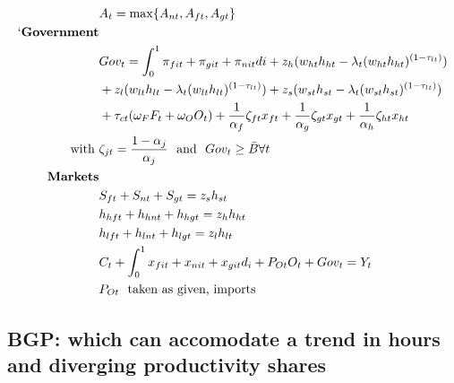 \begin{align}
&A_t=\max\{A_{nt}, A_{ft}, A_{gt}\}\\`
\text{\textbf{Government}}&\\
&Gov_t=\int_{0}^{1}\pi_{fit}+\pi_{git}+\pi_{nit}di+z_h(w_{ht}h_{ht}-\lambda_t(w_{ht}h_{ht})^{(1-\tau_{lt})})\\&+z_l(w_{lt}h_{lt}-\lambda_t(w_{lt}h_{lt})^{(1-\tau_{lt})})+z_s(w_{st}h_{st}-\lambda_t(w_{st}h_{st})^{(1-\tau_{lt})})\\ &+\tau_{ct}(\omega_FF_t+\omega_OO_t) + \frac{1}{\alpha_f}\zeta_{ft}x_{ft}+\frac{1}{\alpha_g}\zeta_{gt}x_{gt}+ \frac{1}{\alpha_h}\zeta_{ht}x_{ht}\\
\text{with}\ \vspace{4mm}&\zeta_{jt}=\frac{1-\alpha_j}{\alpha_j}\ \ \text{and} \ \ Gov_t\geq \bar{B} \forall t\\
\text{\textbf{Markets}}&\\
& S_{ft}+ S_{nt}+ S_{gt}=z_sh_{st}\\
&h_{hft}+h_{hnt}+h_{hgt}=z_{h} h_{ht}\\
&h_{lft}+h_{lnt}+h_{lgt}=z_{l} h_{lt}\\
&C_{t}+\int_{0}^{1} x_{fit}+x_{nit}+x_{git}d_i+P_{Ot}O_t+Gov_t=Y_t\\
&P_{Ot}\ \ \text{taken as given, imports}
\end{align}
\subsection{BGP: which can accomodate a trend in hours and diverging productivity shares}

